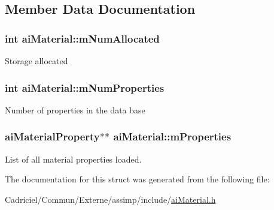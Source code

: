 \subsection{Member Data Documentation}
\hypertarget{structai_material_a84a0016a263362c52b27a9d8d76dc449}{
\subsubsection[{m\-Num\-Allocated}]{ {\bf int} ai\-Material\-::m\-Num\-Allocated}}\label{structai_material_a84a0016a263362c52b27a9d8d76dc449}
Storage allocated \hypertarget{structai_material_a243b07afdc6507f8878c93a2cafe4963}{
\subsubsection[{m\-Num\-Properties}]{ {\bf int} ai\-Material\-::m\-Num\-Properties}}\label{structai_material_a243b07afdc6507f8878c93a2cafe4963}
Number of properties in the data base \hypertarget{structai_material_af32b125d54bff5bc1fc54a1007487cab}{
\subsubsection[{m\-Properties}]{ ai\-Material\-Property$\ast$$\ast$ ai\-Material\-::m\-Properties}}\label{structai_material_af32b125d54bff5bc1fc54a1007487cab}
List of all material properties loaded. 

The documentation for this struct was generated from the following file\-:\begin{DoxyCompactItemize}
\item 
Cadriciel/\-Commun/\-Externe/assimp/include/\hyperlink{ai_material_8h}{ai\-Material.\-h}\end{DoxyCompactItemize}
